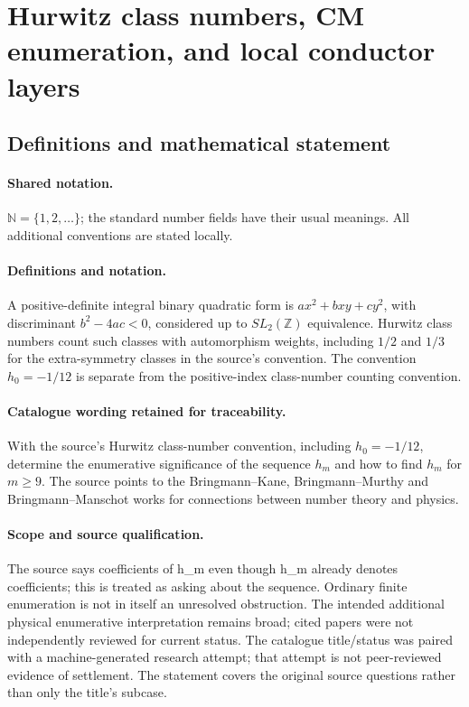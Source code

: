 \documentclass[11pt]{article}
\begin{document}
\section{Hurwitz class numbers, CM enumeration, and local conductor layers}\label{statement}

\subsection{Definitions and mathematical statement}

\paragraph{Shared notation.}$\mathbb N=\{1,2,\ldots\}$; the standard number fields have their usual meanings. All additional conventions are stated locally.


\paragraph{Definitions and notation.}A positive-definite integral binary quadratic form is $ax^2+bxy+cy^2$, with discriminant $b^2-4ac<0$, considered up to $SL_2(\mathbb Z)$ equivalence. Hurwitz class numbers count such classes with automorphism weights, including $1/2$ and $1/3$ for the extra-symmetry classes in the source’s convention. The convention $h_0=-1/12$ is separate from the positive-index class-number counting convention.

\paragraph{Catalogue wording retained for traceability.}
With the source’s Hurwitz class-number convention, including $h_0=-1/12$, determine the enumerative significance of the sequence $h_m$ and how to find $h_m$ for $m\ge9$. The source points to the Bringmann--Kane, Bringmann--Murthy and Bringmann--Manschot works for connections between number theory and physics.
\paragraph{Scope and source qualification.}The source says coefficients of h_m even though h_m already denotes coefficients; this is treated as asking about the sequence. Ordinary finite enumeration is not in itself an unresolved obstruction. The intended additional physical enumerative interpretation remains broad; cited papers were not independently reviewed for current status. The catalogue title/status was paired with a machine-generated research attempt; that attempt is not peer-reviewed evidence of settlement. The statement covers the original source questions rather than only the title’s subcase.
\end{document}
